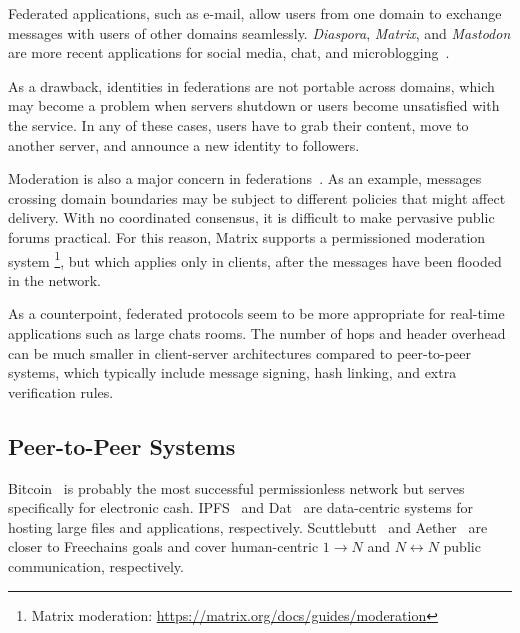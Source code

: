 \documentclass[10pt,journal,compsoc]{IEEEtran}
\newcommand{\FC}       {Freechains\xspace}
\newcommand{\Xon} {$1{\rightarrow}N$\xspace}
\newcommand{\Xnn} {$N{\leftrightarrow}N$\xspace}
\begin{document}
Federated applications, such as e-mail, allow users from one domain to exchange
messages with users of other domains seamlessly.
\emph{Diaspora}, \emph{Matrix}, and \emph{Mastodon} are more recent
applications for social media, chat, and microblogging~\cite{p2p.ecosystem}.

As a drawback, identities in federations are not portable across domains, which
may become a problem when servers shutdown or users become unsatisfied with the
service.
In any of these cases, users have to grab their content, move to another
server, and announce a new identity to followers.

Moderation is also a major concern in federations~\cite{p2p.ecosystem}.
As an example, messages crossing domain boundaries may be subject to different
policies that might affect delivery.
With no coordinated consensus, it is difficult to make pervasive public forums
practical.
%
For this reason, Matrix supports a permissioned moderation system%
\footnote{Matrix moderation: \url{https://matrix.org/docs/guides/moderation}},
but which applies only in clients, after the messages have been flooded in the
network.

As a counterpoint, federated protocols seem to be more appropriate for
real-time applications such as large chats rooms.
The number of hops and header overhead can be much smaller in client-server
architectures compared to peer-to-peer systems, which typically include message
signing, hash linking, and extra verification rules.

\subsection{Peer-to-Peer Systems}

Bitcoin~\cite{p2p.bitcoin} is probably the most successful permissionless
network but serves specifically for electronic cash.
IPFS~\cite{p2p.ipfs} and Dat~\cite{p2p.dat} are data-centric systems for
hosting large files and applications, respectively.
Scuttlebutt~\cite{p2p.scuttlebutt} and Aether~\cite{p2p.ecosystem} are closer
to \FC goals and cover human-centric \Xon and \Xnn public communication,
respectively.
\end{document}

